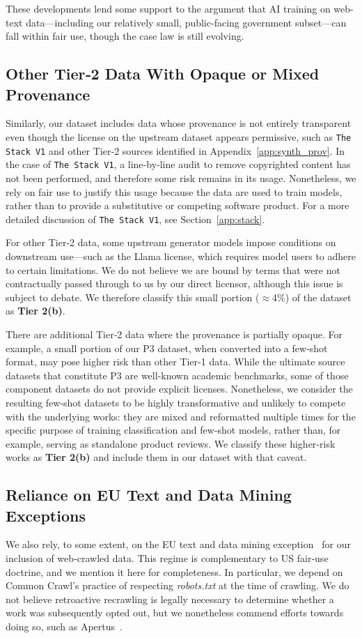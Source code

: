 These developments lend some support to the argument that AI training on web-text data—including our relatively small, public-facing government subset—can fall within fair use, though the case law is still evolving.

\subsection{Other Tier‑2 Data With Opaque or Mixed Provenance}
Similarly, our dataset includes data whose provenance is not entirely transparent even though the license on the upstream dataset appears permissive, such as \texttt{The Stack V1} and other Tier‑2 sources identified in Appendix~\ref{app:synth_prov}. In the case of \texttt{The Stack V1}, a line‑by‑line audit to remove copyrighted content has not been performed, and therefore some risk remains in its usage. Nonetheless, we rely on fair use to justify this usage because the data are used to train models, rather than to provide a substitutive or competing software product. For a more detailed discussion of \texttt{The Stack V1}, see Section~\ref{app:stack}.

For other Tier‑2 data, some upstream generator models impose conditions on downstream use—such as the Llama license, which requires model users to adhere to certain limitations. We do not believe we are bound by terms that were not contractually passed through to us by our direct licensor, although this issue is subject to debate. We therefore classify this small portion ($\approx$4\%) of the dataset as \textbf{Tier 2(b)}.

There are additional Tier‑2 data where the provenance is partially opaque. For example, a small portion of our P3 dataset, when converted into a few‑shot format, may pose higher risk than other Tier‑1 data. While the ultimate source datasets that constitute P3 are well‑known academic benchmarks, some of those component datasets do not provide explicit licenses. Nonetheless, we consider the resulting few‑shot datasets to be highly transformative and unlikely to compete with the underlying works: they are mixed and reformatted multiple times for the specific purpose of training classification and few‑shot models, rather than, for example, serving as standalone product reviews. We classify these higher‑risk works as \textbf{Tier 2(b)} and include them in our dataset with that caveat.

\subsection{Reliance on EU Text and Data Mining Exceptions}
We also rely, to some extent, on the EU text and data mining exception~\citep{eu_directive_tdm_2019} for our inclusion of web‑crawled data. This regime is complementary to US fair‑use doctrine, and we mention it here for completeness. In particular, we depend on Common Crawl’s practice of respecting \textit{robots.txt} at the time of crawling. We do not believe retroactive recrawling is legally necessary to determine whether a work was subsequently opted out, but we nonetheless commend efforts towards doing so, such as Apertus~\citep{apertus2025apertusdemocratizingopencompliant}.

